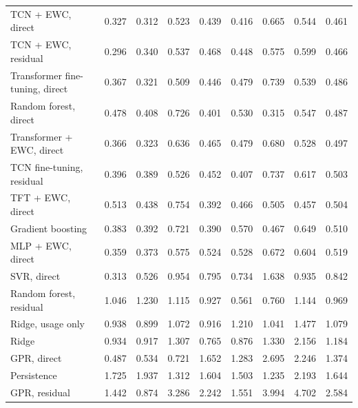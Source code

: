 \begin{table}[t]
\begin{tabular}{lrrrrrrrr}
    TCN + EWC, direct & 0.327 & 0.312 & 0.523 & 0.439 & 0.416 & 0.665 & 0.544 & 0.461 \\
    TCN + EWC, residual & 0.296 & 0.340 & 0.537 & 0.468 & 0.448 & 0.575 & 0.599 & 0.466 \\
    Transformer fine-tuning, direct & 0.367 & 0.321 & 0.509 & 0.446 & 0.479 & 0.739 & 0.539 & 0.486 \\
    Random forest, direct & 0.478 & 0.408 & 0.726 & 0.401 & 0.530 & 0.315 & 0.547 & 0.487 \\
    Transformer + EWC, direct & 0.366 & 0.323 & 0.636 & 0.465 & 0.479 & 0.680 & 0.528 & 0.497 \\
    TCN fine-tuning, residual & 0.396 & 0.389 & 0.526 & 0.452 & 0.407 & 0.737 & 0.617 & 0.503 \\
    TFT + EWC, direct & 0.513 & 0.438 & 0.754 & 0.392 & 0.466 & 0.505 & 0.457 & 0.504 \\
    Gradient boosting & 0.383 & 0.392 & 0.721 & 0.390 & 0.570 & 0.467 & 0.649 & 0.510 \\
    MLP + EWC, direct & 0.359 & 0.373 & 0.575 & 0.524 & 0.528 & 0.672 & 0.604 & 0.519 \\
    SVR, direct & 0.313 & 0.526 & 0.954 & 0.795 & 0.734 & 1.638 & 0.935 & 0.842 \\
    Random forest, residual & 1.046 & 1.230 & 1.115 & 0.927 & 0.561 & 0.760 & 1.144 & 0.969 \\
    Ridge, usage only & 0.938 & 0.899 & 1.072 & 0.916 & 1.210 & 1.041 & 1.477 & 1.079 \\
    Ridge & 0.934 & 0.917 & 1.307 & 0.765 & 0.876 & 1.330 & 2.156 & 1.184 \\
    GPR, direct & 0.487 & 0.534 & 0.721 & 1.652 & 1.283 & 2.695 & 2.246 & 1.374 \\
    Persistence & 1.725 & 1.937 & 1.312 & 1.604 & 1.503 & 1.235 & 2.193 & 1.644 \\
    GPR, residual & 1.442 & 0.874 & 3.286 & 2.242 & 1.551 & 3.994 & 4.702 & 2.584 \\
    \bottomrule
  \end{tabular}
\end{table}
